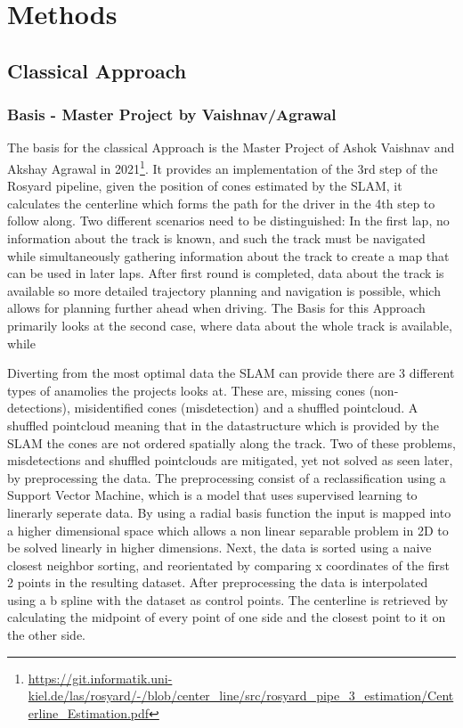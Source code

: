 \graphicspath{{Chapter/Figs/methods/}}
\chapter{Methods}


\section{Classical Approach}

\subsection{Basis - Master Project by Vaishnav/Agrawal}
The basis for the classical Approach is the Master Project of Ashok Vaishnav and Akshay Agrawal in 2021\footnote{\url{https://git.informatik.uni-kiel.de/las/rosyard/-/blob/center_line/src/rosyard_pipe_3_estimation/Centerline_Estimation.pdf}}.
It provides an implementation of the 3rd step of the Rosyard pipeline, given the position of cones estimated by the SLAM, it calculates the centerline which forms the path for the driver in the 4th step to follow along.
Two different scenarios need to be distinguished: In the first lap, no information about the track is known, and such the track must be navigated while simultaneously gathering information about the track to create a map that can be used in later laps. After first round is completed, data about the track is available so more detailed trajectory planning and navigation is possible, which allows for planning further ahead when driving. The Basis for this Approach primarily looks at the second case, where data about the whole track is available, while 

Diverting from the most optimal data the SLAM can provide there are 3 different types of anamolies the projects looks at. These are, missing cones (non-detections), misidentified cones (misdetection) and a shuffled pointcloud. A shuffled pointcloud meaning that in the datastructure which is provided by the SLAM the cones are not ordered spatially along the track. Two of these problems, misdetections and shuffled pointclouds are mitigated, yet not solved as seen later, by preprocessing the data. The preprocessing consist of a reclassification using a Support Vector Machine\cite{cortes1995}, which is a model that uses supervised learning to linerarly seperate data. By using a radial basis function the input is mapped into a higher dimensional space which allows a non linear separable problem in 2D to be solved linearly in higher dimensions. Next, the data is sorted using a naive closest neighbor sorting, and reorientated by comparing x coordinates of the first 2 points in the resulting dataset. After preprocessing the data is interpolated using a b spline with the dataset as control points. The centerline is retrieved by calculating the midpoint of every point of one side and the closest point to it on the other side.

